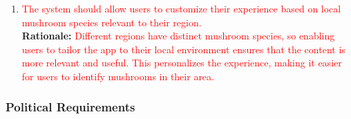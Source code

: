 \documentclass{article}
\begin{document}
\begin{enumerate}[{CP-C}1. ]
	\item \textcolor{red}{The system should allow users to customize their experience based on local mushroom species relevant to their region.}\\
	\textbf{Rationale:} \textcolor{red}{Different regions have distinct mushroom species, so enabling users to tailor the app to their local environment ensures that the content is more relevant and useful. This personalizes the experience, making it easier for users to identify mushrooms in their area.}\\

\end{enumerate}


\subsubsection{Political Requirements}
\end{document}
